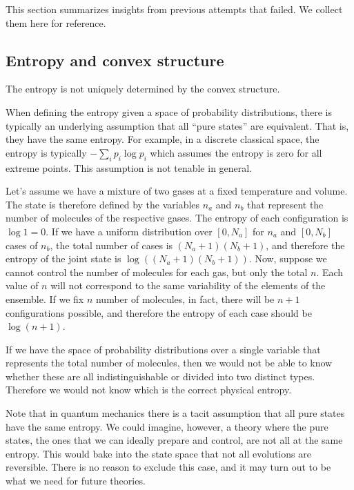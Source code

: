 This section summarizes insights from previous attempts that failed. We collect them here for reference.

\subsection{Entropy and convex structure}

\begin{insight}
	The entropy is not uniquely determined by the convex structure.
\end{insight}

When defining the entropy given a space of probability distributions, there is typically an underlying assumption that all ``pure states'' are equivalent. That is, they have the same entropy. For example, in a discrete classical space, the entropy is typically $-\sum_i p_i \log p_i$ which assumes the entropy is zero for all extreme points. This assumption is not tenable in general.

\begin{example}
	Let's assume we have a mixture of two gases at a fixed temperature and volume. The state is therefore defined by the variables $n_a$ and $n_b$ that represent the number of molecules of the respective gases. The entropy of each configuration is $\log 1 = 0$. If we have a uniform distribution over $[0,N_a]$ for $n_a$ and $[0,N_b]$ cases of $n_b$, the total number of cases is $(N_a + 1) (N_b + 1)$, and therefore the entropy of the joint state is $\log ((N_a + 1) (N_b + 1))$. Now, suppose we cannot control the number of molecules for each gas, but only the total $n$. Each value of $n$ will not correspond to the same variability of the elements of the ensemble. If we fix $n$ number of molecules, in fact, there will be $n+1$ configurations possible, and therefore the entropy of each case should be $\log (n+1)$.
	
	If we have the space of probability distributions over a single variable that represents the total number of molecules, then we would not be able to know whether these are all indistinguishable or divided into two distinct types. Therefore we would not know which is the correct physical entropy.
\end{example}

Note that in quantum mechanics there is a tacit assumption that all pure states have the same entropy. We could imagine, however, a theory where the pure states, the ones that we can ideally prepare and control, are not all at the same entropy. This would bake into the state space that not all evolutions are reversible. There is no reason to exclude this case, and it may turn out to be what we need for future theories.

